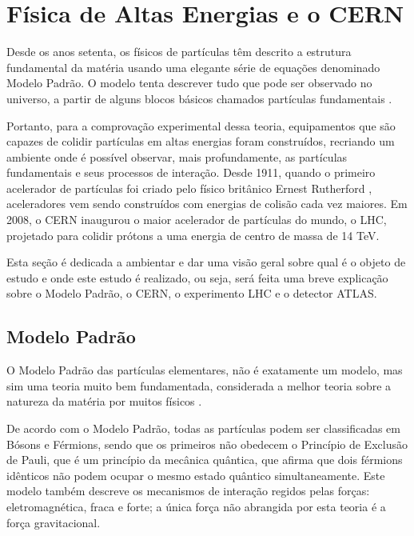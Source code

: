 \chapter{Física de Altas Energias e o CERN}\label{cap:LHC}
	
Desde os anos setenta, os físicos de partículas têm descrito a estrutura fundamental da matéria usando uma elegante série de equações denominado Modelo Padrão. O modelo tenta descrever tudo que pode ser observado no universo, a partir de alguns blocos básicos chamados partículas fundamentais \cite{cernphisics}.

Portanto, para a comprovação experimental dessa teoria, equipamentos que são capazes de colidir partículas em altas energias foram construídos, recriando um ambiente onde é possível observar, mais profundamente, as partículas fundamentais e seus processos de interação. Desde 1911, quando o primeiro acelerador de partículas foi criado pelo físico britânico Ernest Rutherford \cite{aceleradores2015}, aceleradores vem sendo construídos com energias de colisão cada vez maiores. Em 2008, o \ac{CERN} inaugurou o maior acelerador de partículas do mundo, o \ac{LHC}, projetado para colidir prótons a uma energia de centro de massa de 14 TeV.
	
Esta seção é dedicada a ambientar e dar uma visão geral sobre qual é o objeto de estudo e onde este estudo é realizado, ou seja, será feita uma breve explicação sobre o Modelo Padrão, o CERN, o experimento LHC e o detector ATLAS.


\section{Modelo Padrão}

O Modelo Padrão das partículas elementares, não é exatamente um modelo, mas sim uma teoria muito bem fundamentada, considerada a melhor teoria sobre a natureza da matéria por muitos físicos \cite{moreira2009modelo}.

De acordo com o Modelo Padrão, todas  as  partículas  podem  ser  classificadas  em  Bósons  e  Férmions, sendo que os primeiros não obedecem o Princípio de Exclusão de Pauli, que é um princípio da mecânica quântica, que afirma que dois férmions idênticos não podem ocupar o mesmo estado quântico simultaneamente. Este modelo também descreve os mecanismos de interação regidos pelas forças: eletromagnética, fraca e forte; a única força não abrangida por esta teoria é a força gravitacional. \cite{perkins2000introduction}

